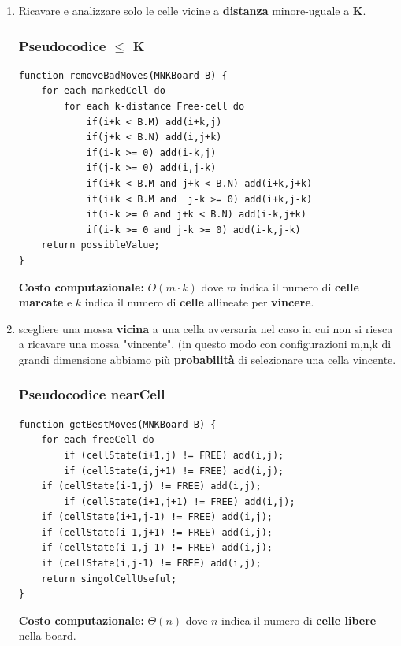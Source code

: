 \documentclass{article}
\begin{document}
    \begin{enumerate}
        \item Ricavare e analizzare solo le celle vicine a \textbf{distanza} minore-uguale a \textbf{K}. 
    \subsubsection{Pseudocodice $\leq$ K}
    \lstset{language=java}
    \begin{lstlisting}[frame=single]  
function removeBadMoves(MNKBoard B) {
    for each markedCell do
        for each k-distance Free-cell do 
            if(i+k < B.M) add(i+k,j)
    	    if(j+k < B.N) add(i,j+k)
    	    if(i-k >= 0) add(i-k,j)
    	    if(j-k >= 0) add(i,j-k)
    	    if(i+k < B.M and j+k < B.N) add(i+k,j+k)
    	    if(i+k < B.M and  j-k >= 0) add(i+k,j-k)
    	    if(i-k >= 0 and j+k < B.N) add(i-k,j+k)
    	    if(i-k >= 0 and j-k >= 0) add(i-k,j-k)
    return possibleValue;
}
    \end{lstlisting}
        
        \textbf{Costo computazionale:} $O(m \cdot k)$ dove $m$ indica il numero di \textbf{celle marcate} e $k$ indica il numero di \textbf{celle} allineate per \textbf{vincere}.
        
        \item scegliere una mossa \textbf{vicina} a una cella avversaria nel caso in cui non si riesca a ricavare una mossa "vincente". (in questo modo con configurazioni m,n,k di grandi dimensione abbiamo più \textbf{probabilità} di selezionare una cella vincente. 
        
    \subsubsection{Pseudocodice nearCell}
    \lstset{language=java}
    \begin{lstlisting}[frame=single]  
function getBestMoves(MNKBoard B) {
    for each freeCell do
        if (cellState(i+1,j) != FREE) add(i,j);
        if (cellState(i,j+1) != FREE) add(i,j);
	if (cellState(i-1,j) != FREE) add(i,j);
        if (cellState(i+1,j+1) != FREE) add(i,j);
	if (cellState(i+1,j-1) != FREE) add(i,j);
	if (cellState(i-1,j+1) != FREE) add(i,j);
	if (cellState(i-1,j-1) != FREE) add(i,j);
	if (cellState(i,j-1) != FREE) add(i,j);
    return singolCellUseful;
}
    \end{lstlisting}
        
        \textbf{Costo computazionale:} $\Theta(n)$ dove $n$ indica il numero di \textbf{celle libere} nella board.
        
    \end{enumerate}
    
\end{document}
